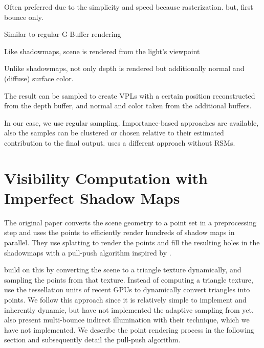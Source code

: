 \begin{outline}
\1 Often preferred due to the simplicity and speed because rasterization. but, first bounce only.

\1 Similar to regular G-Buffer rendering

\1 Like shadowmaps, scene is rendered from the light's viewpoint

\1 Unlike shadowmaps, not only depth is rendered but additionally normal and (diffuse) surface color.

\1 The result can be sampled to create VPLs with a certain position reconstructed from the depth buffer, and normal and color taken from the additional buffers.

\1 In our case, we use regular sampling. Importance-based approaches are available, also the samples can be clustered \cite{} or chosen relative to their estimated contribution to the final output. \citet{hedman2016sequential} uses a different approach without RSMs.

\end{outline}

\section{Visibility Computation with Imperfect Shadow Maps}
\label{sec:concept:ism}


The original paper \citep{ritschel2008ism} converts the scene geometry to a point set in a preprocessing step and uses the points to efficiently render hundreds of shadow maps in parallel. They use splatting to render the points and fill the resulting holes in the shadowmaps with a pull-push algorithm inspired by \citep{Marroquim:2007:reconstruction}.

\citet{ritschel2011ismsViewAdaptive} build on this by converting the scene to a triangle texture dynamically, and sampling the points from that texture. Instead of computing a triangle texture, \citet{barak2013temporally} use the tessellation units of recent GPUs to dynamically convert triangles into points.
We follow this approach since it is relatively simple to implement and inherently dynamic, but have not implemented the adaptive sampling from \citet{ritschel2011ismsViewAdaptive} yet.
\citet{ritschel2008ism} also present multi-bounce indirect illumination with their technique, which we have not implemented.
We describe the point rendering process in the following section and subsequently detail the pull-push algorithm.

